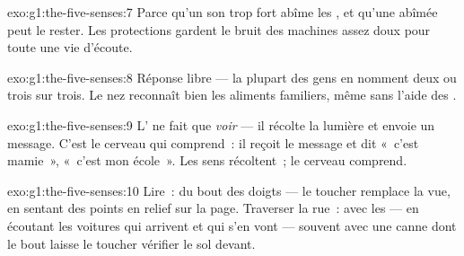 \begin{solution}{exo:g1:the-five-senses:7}
Parce qu'un son trop fort abîme les , et qu'une 
abîmée peut le rester. Les protections gardent le bruit des machines
assez doux pour toute une vie d'écoute.
\end{solution}

\begin{solution}{exo:g1:the-five-senses:8}
Réponse libre --- la plupart des gens en nomment deux ou trois sur
trois. Le nez reconnaît bien les aliments familiers, même sans
l'aide des .
\end{solution}

\begin{solution}{exo:g1:the-five-senses:9}
L' ne fait que \emph{voir} --- il récolte la lumière et envoie un
message. C'est le cerveau qui comprend~: il reçoit le message et dit
«~c'est mamie~», «~c'est mon école~». Les sens récoltent~; le
cerveau comprend.
\end{solution}

\begin{solution}{exo:g1:the-five-senses:10}
Lire~: du bout des doigts --- le toucher remplace la vue, en sentant
des points en relief sur la page. Traverser la rue~: avec les
 --- en écoutant les voitures qui arrivent et qui s'en vont
--- souvent avec une canne dont le bout laisse le toucher vérifier
le sol devant.
\end{solution}
